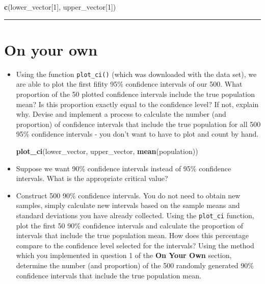 \documentclass[]{book}
\newenvironment{Shaded}{\begin{snugshade}}{\end{snugshade}}
\newcommand{\DecValTok}[1]{\textcolor[rgb]{0.00,0.00,0.81}{#1}}
\newcommand{\KeywordTok}[1]{\textcolor[rgb]{0.13,0.29,0.53}{\textbf{#1}}}
\newcommand{\NormalTok}[1]{#1}
\theoremstyle{definition}
\theoremstyle{definition}
\theoremstyle{definition}
\theoremstyle{remark}
\begin{document}
\begin{Shaded}
\begin{Highlighting}[]
\KeywordTok{c}\NormalTok{(lower_vector[}\DecValTok{1}\NormalTok{], upper_vector[}\DecValTok{1}\NormalTok{])}
\end{Highlighting}
\end{Shaded}

\begin{center}\rule{0.5\linewidth}{\linethickness}\end{center}

\hypertarget{on-your-own-4}{%
\section{On your own}\label{on-your-own-4}}

\begin{itemize}
\item
  Using the function \texttt{plot\_ci()} (which was downloaded with the
  data set), we are able to plot the first fifity 95\% confidence
  intervals of our 500. What proportion of the 50 plotted confidence
  intervals include the true population mean? Is this proportion exactly
  equal to the confidence level? If not, explain why. Devise and
  implement a process to calculate the number (and proportion) of
  confidence intervals that include the true population for all 500 95\%
  confidence intervals - you don't want to have to plot and count by
  hand.

\begin{Shaded}
\begin{Highlighting}[]
\KeywordTok{plot_ci}\NormalTok{(lower_vector, upper_vector, }\KeywordTok{mean}\NormalTok{(population))}
\end{Highlighting}
\end{Shaded}
\item
  Suppose we want 90\% confidence intervals instead of 95\% confidence
  intervals. What is the appropriate critical value?
\item
  Construct 500 90\% confidence intervals. You do not need to obtain new
  samples, simply calculate new intervals based on the sample means and
  standard deviations you have already collected. Using the
  \texttt{plot\_ci} function, plot the first 50 90\% confidence
  intervals and calculate the proportion of intervals that include the
  true population mean. How does this percentage compare to the
  confidence level selected for the intervals? Using the method which
  you implemented in question 1 of the \textbf{On Your Own} section,
  determine the number (and proportion) of the 500 randomly generated
  90\% confidence intervals that include the true population mean.
\end{itemize}
\end{document}
